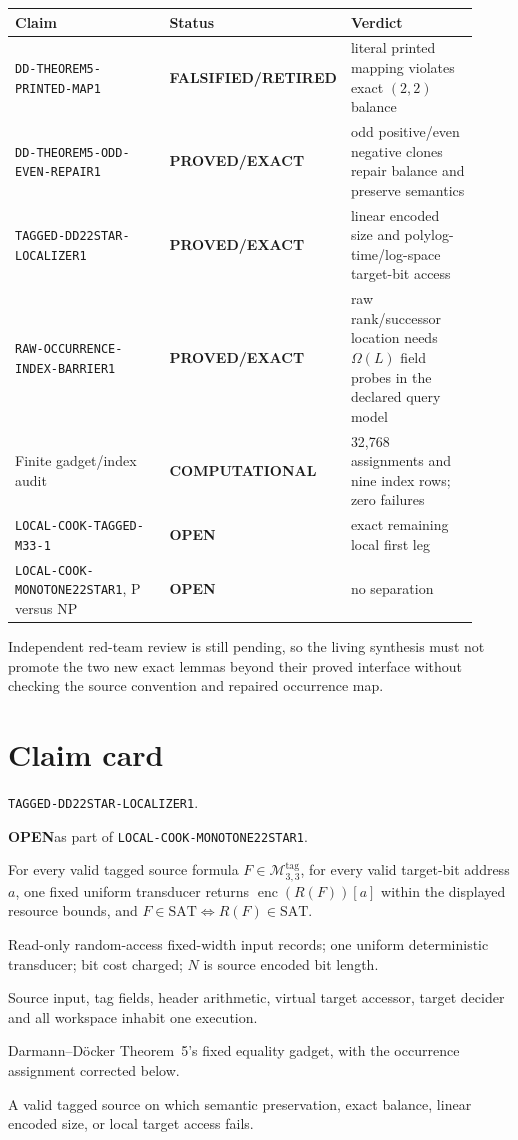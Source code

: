 \documentclass[11pt]{article}
\newcommand{\EXACT}{\textbf{PROVED/EXACT}}
\newcommand{\OPEN}{\textbf{OPEN}}
\newcommand{\RETIRED}{\textbf{FALSIFIED/RETIRED}}
\newcommand{\COMP}{\textbf{COMPUTATIONAL}}
\newcommand{\Mthree}{\mathcal M_{3,3}^{\mathrm{tag}}}
\begin{document}
\begin{center}\small
\begin{tabular}{@{}p{0.40\linewidth}p{0.19\linewidth}p{0.33\linewidth}@{}}
\toprule
Claim & Status & Verdict\\ \midrule
\texttt{DD-THEOREM5-PRINTED-MAP1} & \RETIRED & literal printed mapping
violates exact $(2,2)$ balance\\
\texttt{DD-THEOREM5-ODD-EVEN-REPAIR1} & \EXACT & odd positive/even negative
clones repair balance and preserve semantics\\
\texttt{TAGGED-DD22STAR-LOCALIZER1} & \EXACT & linear encoded size and
polylog-time/log-space target-bit access\\
\texttt{RAW-OCCURRENCE-INDEX-BARRIER1} & \EXACT & raw rank/successor
location needs $\Omega(L)$ field probes in the declared query model\\
Finite gadget/index audit & \COMP & 32,768 assignments and nine index rows;
zero failures\\
\texttt{LOCAL-COOK-TAGGED-M33-1} & \OPEN & exact remaining local first leg\\
\texttt{LOCAL-COOK-MONOTONE22STAR1}, P versus NP & \OPEN & no separation\\
\bottomrule
\end{tabular}
\end{center}

Independent red-team review is still pending, so the living synthesis must
not promote the two new exact lemmas beyond their proved interface without
checking the source convention and repaired occurrence map.

\section{Claim card}

\begin{description}[leftmargin=3.4cm,style=nextline]
\item[Claim ID.] \texttt{TAGGED-DD22STAR-LOCALIZER1}.
\item[Status before run.] \OPEN as part of
\texttt{LOCAL-COOK-MONOTONE22STAR1}.
\item[Exact prefix.]
For every valid tagged source formula $F\in\Mthree$, for every valid
target-bit address $a$, one fixed uniform transducer returns
$\operatorname{enc}(R(F))[a]$ within the displayed resource bounds, and
$F\in\mathrm{SAT}\Leftrightarrow R(F)\in\mathrm{SAT}$.
\item[Models.] Read-only random-access fixed-width input records; one uniform
deterministic transducer; bit cost charged; $N$ is source encoded bit length.
\item[SAME\_REALIZATION.] Source input, tag fields, header arithmetic, virtual
target accessor, target decider and all workspace inhabit one execution.
\item[Minimum predecessor.] Darmann--D\"ocker Theorem~5's fixed equality
gadget, with the occurrence assignment corrected below.
\item[Falsifier.] A valid tagged source on which semantic preservation,
exact balance, linear encoded size, or local target access fails.
\end{description}
\end{document}
